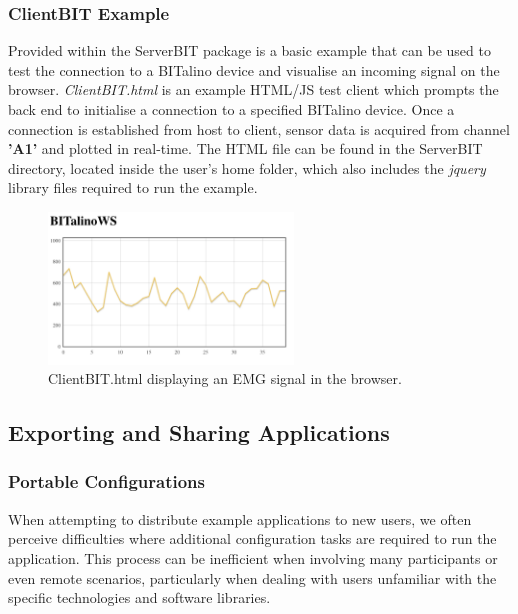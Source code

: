 \subsubsection*{ClientBIT Example}
Provided within the ServerBIT package is a basic example that can be used to test the connection to a BITalino device and visualise an incoming signal on the browser. \textit{ClientBIT.html} is an example HTML/JS
test client which prompts the back end to initialise a connection to a specified BITalino device. Once a connection is established from host to client, sensor data is acquired from channel \textbf{'A1'} and plotted in real-time. The HTML file can be found in the ServerBIT directory, located inside the user's home folder, which also includes the \textit{jquery} library files required to run the example.

\begin{figure}[htbp]
    \centering
    \includegraphics[width=65mm,scale=0.65]{Chapters/Figures/technical/ServerBIT/ClientBIT_html.png}
    \caption{ClientBIT.html displaying an EMG signal in the browser.}
    \label{fig:ClientBIT}
\end{figure}

\subsection{Exporting and Sharing Applications}

\subsubsection*{Portable Configurations}

When attempting to distribute example applications to new users, we often perceive difficulties where additional configuration tasks are required to run the application. This process can be inefficient when involving many participants or even remote scenarios, particularly when dealing with users unfamiliar with the specific technologies and software libraries.

